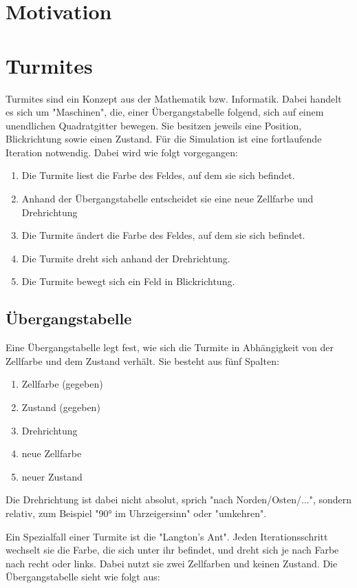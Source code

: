 \section{Motivation}

\section{Turmites}
Turmites sind ein Konzept aus der Mathematik bzw. Informatik. Dabei handelt es sich um "Maschinen", die, einer Übergangstabelle folgend, sich auf einem unendlichen Quadratgitter bewegen. Sie besitzen jeweils eine Position, Blickrichtung sowie einen Zustand. Für die Simulation ist eine fortlaufende Iteration notwendig. Dabei wird wie folgt vorgegangen:
\begin{enumerate}
    \item Die Turmite liest die Farbe des Feldes, auf dem sie sich befindet.
    \item Anhand der Übergangstabelle entscheidet sie eine neue Zellfarbe und Drehrichtung
    \item Die Turmite ändert die Farbe des Feldes, auf dem sie sich befindet.
    \item Die Turmite dreht sich anhand der Drehrichtung.
    \item Die Turmite bewegt sich ein Feld in Blickrichtung.
\end{enumerate}

\subsection{Übergangstabelle}
Eine Übergangstabelle legt fest, wie sich die Turmite in Abhängigkeit von der Zellfarbe und dem Zustand verhält. Sie besteht aus fünf Spalten:
\begin{enumerate}
    \item Zellfarbe (gegeben)
    \item Zustand (gegeben)
    \item Drehrichtung
    \item neue Zellfarbe
    \item neuer Zustand
\end{enumerate}

Die Drehrichtung ist dabei nicht absolut, sprich "nach Norden/Osten/...", sondern relativ, zum Beispiel "90° im Uhrzeigersinn" oder "umkehren".

Ein Spezialfall einer Turmite ist die "Langton's Ant". Jeden Iterationsschritt wechselt sie die Farbe, die sich unter ihr befindet, und dreht sich je nach Farbe nach recht oder links. Dabei nutzt sie zwei Zellfarben und keinen Zustand. Die Übergangstabelle sieht wie folgt aus:

